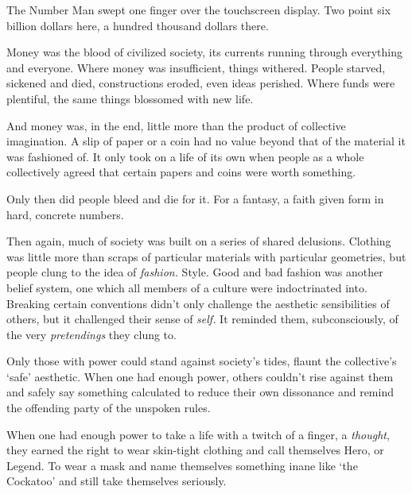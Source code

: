 





The Number Man swept one finger over the touchscreen display.  Two point six billion dollars here, a hundred thousand dollars there.



Money was the blood of civilized society, its currents running through everything and everyone.  Where money was insufficient, things withered.  People starved, sickened and died, constructions eroded, even ideas perished.  Where funds were plentiful, the same things blossomed with new life.



And money was, in the end, little more than the product of collective imagination.  A slip of paper or a coin had no value beyond that of the material it was fashioned of.  It only took on a life of its own when people as a whole collectively agreed that certain papers and coins were worth something.



Only then did people bleed and die for it.  For a fantasy, a faith given form in hard, concrete numbers.



Then again, much of society was built on a series of shared delusions.  Clothing was little more than scraps of particular materials with particular geometries, but people clung to the idea of \emph{fashion.  }Style.  Good and bad fashion was another belief system, one which all members of a culture were indoctrinated into.  Breaking certain conventions didn't only challenge the aesthetic sensibilities of others, but it challenged their sense of \emph{self.  }It reminded them, subconsciously, of the very \emph{pretendings} they clung to.



Only those with power could stand against society's tides, flaunt the collective's `safe' aesthetic.  When one had enough power, others couldn't rise against them and safely say something calculated to reduce their own dissonance and remind the offending party of the unspoken rules.



When one had enough power to take a life with a twitch of a finger, a \emph{thought}, they earned the right to wear skin-tight clothing and call themselves Hero, or Legend.  To wear a mask and name themselves something inane like `the Cockatoo' and still take themselves seriously.



